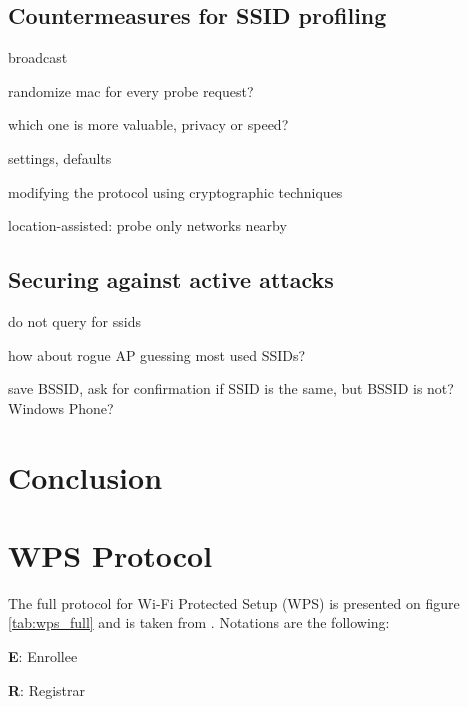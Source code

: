 \documentclass[12pt,a4paper,oneside,pdftex]{report}
\begin{document}
\section{Countermeasures for SSID profiling}
\label{sec:countermeasures_ssid}
broadcast

randomize mac for every probe request?

which one is more valuable, privacy or speed?

settings, defaults

modifying the protocol using cryptographic techniques~\cite{lindqvist2009privacy}

location-assisted: probe only networks nearby~\cite{kimposter}

\section{Securing against active attacks}

do not query for ssids

how about rogue AP guessing most used SSIDs?

save BSSID, ask for confirmation if SSID is the same, but BSSID is not? Windows Phone? 




\chapter{Conclusion}
\label{chapter:conclusion}


% 



\appendix
\chapter{WPS Protocol}
\label{chapter:appendix:wps}

The full protocol for Wi-Fi Protected Setup (WPS) is presented on figure \ref{tab:wps_full} and is taken from \cite{microsoftWCN}. Notations are the following:

\textbf{E}: Enrollee

\textbf{R}: Registrar
\end{document}
